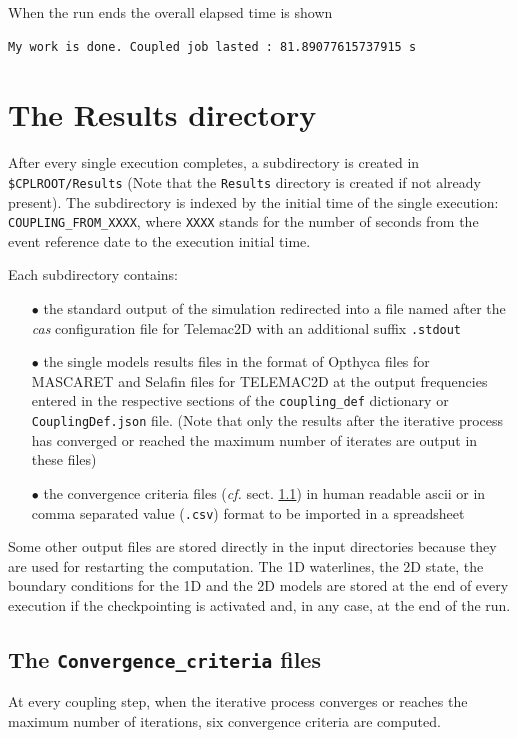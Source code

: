\documentclass[Coupling]{../../data/TelemacDoc} %
\begin{document}
When the run ends the overall elapsed time is shown
\begin{verbatim}
My work is done. Coupled job lasted : 81.89077615737915 s
\end{verbatim}

\chapter{The Results directory}
After every single execution completes, a subdirectory is created in
\texttt{\$CPLROOT/Results} (Note that the \texttt{Results} directory
is created if not already present). The subdirectory is
indexed by the initial time of the single execution:
\texttt{COUPLING\_FROM\_XXXX}, where \texttt{XXXX} stands for the
number of seconds from the event reference date to the execution
initial time.
\newline

Each subdirectory contains:
\begin{itemize}
\item[$\bullet$] the standard output of the simulation redirected into
  a file named after the {\em cas} configuration file for
  Telemac2D with an additional suffix \texttt{.stdout}  
\item[$\bullet$] the single models results files in the
format of Opthyca files for MASCARET and Selafin files for TELEMAC2D
at the output frequencies entered in the respective sections of the
\texttt{coupling\_def} dictionary or
\texttt{CouplingDef.json} file. (Note that only the results after
the iterative process has converged or reached the maximum number of
iterates are output in these files)
\item[$\bullet$] the convergence criteria files ({\em cf.}
  sect. \ref{res:CONVCRIT}) in human readable ascii or in comma
  separated value (\texttt{.csv}) format to be imported in a spreadsheet
\end{itemize}

Some other output files are stored directly in the input directories
because they are used for restarting the computation. The 1D
waterlines, the 2D state, the boundary conditions for the 1D and the
2D models are stored at the end of every execution if the
checkpointing is activated and, in any case, at the end of the run.

\section{The \texttt{Convergence\_criteria} files}\label{res:CONVCRIT}
At every coupling step, when the iterative process converges or
reaches the maximum number of iterations, six convergence criteria are
computed.
\end{document}

